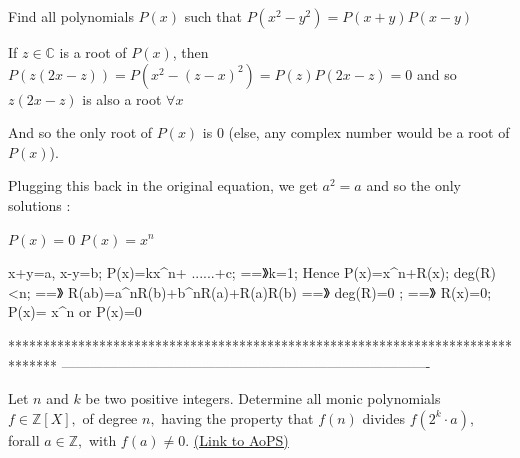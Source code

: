 \begin{solution}
	\begin{tcolorbox}Find all polynomials $ P(x)$ such that
$ P(x^2 - y^2) = P(x + y)P(x - y)$\end{tcolorbox}

If $ z\in\mathbb C$ is a root of $ P(x)$, then $ P(z(2x - z)) = P(x^2 - (z - x)^2) = P(z)P(2x - z) = 0$ and so $ z(2x - z)$ is also a root $ \forall x$ 

And so the only root of $ P(x)$ is $ 0$ (else, any complex number would be a root of $ P(x)$).

Plugging this back in the original equation, we get $ a^2 = a$ and so the only solutions :

$ P(x) = 0$
$ P(x) = x^n$
\end{solution}



\begin{solution}
	x+y=a, x-y=b;
P(x)=kx^n+ ......+c; ==》k=1;
Hence 
P(x)=x^n+R(x);   deg(R)<n;
==》 R(ab)=a^nR(b)+b^nR(a)+R(a)R(b)  
==》 deg(R)=0  ; ==》 R(x)=0;
P(x)= x^n or P(x)=0
\end{solution}
*******************************************************************************
-------------------------------------------------------------------------------

\begin{problem}
	Let $ n$ and $ k$ be two positive integers. Determine all monic polynomials $ f\in\mathbb{Z}[X],$ of degree $ n,$ having the property that $ f(n)$ divides $ f\left (2^{k}\cdot a\right ),$ forall $ a\in\mathbb{Z},$ with $ f(a)\neq 0.$
	\flushright \href{https://artofproblemsolving.com/community/c6h278012}{(Link to AoPS)}
\end{problem}



